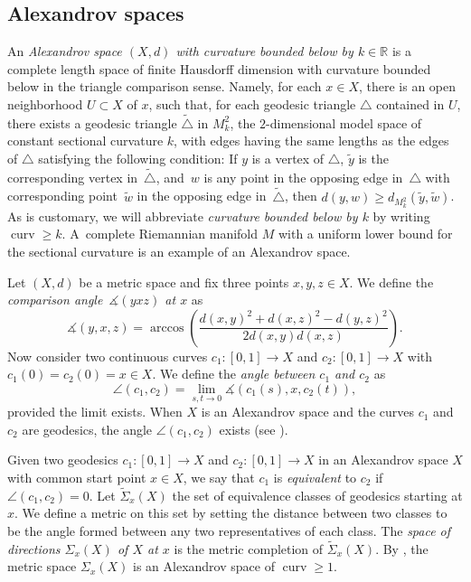\documentclass[pdftex]{sigma}
\numberwithin{equation}{section}
\theoremstyle{definition}
\DeclareMathOperator{\curv}{curv}
\newcommand{\R}{\mathbb{R}} %
\begin{document}
\subsection{Alexandrov spaces}
\label{S: Alexandrov spaces}
An \emph{Alexandrov space $(X, d)$ with curvature bounded below by $k\in \R$} is a complete length space of finite Hausdorff dimension with curvature bounded below in the triangle comparison sense. Namely, for each $x\in X$, there is an open neighborhood $U\subset X$ of $x$, such that, for each geodesic triangle $\triangle$ contained in $U$, there exists a geodesic triangle $\widetilde{\triangle}$ in $M^2_k$, the $2$-dimensional model space of constant sectional curvature $k$, with edges having the same lengths as the edges of $\triangle$ satisfying the following condition: If $y$ is a vertex of $\triangle$, $\widetilde{y}$ is the corresponding vertex in~$\widetilde{\triangle}$, and~$w$ is any point in the opposing edge in~$\triangle$ with corresponding point~$\widetilde{w}$ in the opposing edge in~$\widetilde{\triangle}$, then
$
	d(y,w) \geq d_{M^2_k}(\widetilde{y},\widetilde{w})$.
As is customary, we will abbreviate \emph{curvature bounded below by $k$} by writing $\curv\geq k$. A~complete Riemannian manifold $M$ with a uniform lower bound for the sectional curvature is an example of an Alexandrov space.

Let $(X,d)$ be a metric space and fix three points $x,y,z\in X$. We define the \emph{comparison angle~$\measuredangle(yxz)$ at $x$} as
\[
	\measuredangle (y,x,z) = \arccos\left(\frac{d(x,y)^2+d(x,z)^2-d(y,z)^2}{2d(x,y)d(x,z)} \right).
\]
Now consider two continuous curves $c_1\colon [0,1]\to X$ and $c_2\colon [0,1]\to X$ with $c_1(0) = c_2(0) = {x\in X}$. We define the \emph{angle between $c_1$ and $c_2$} as
\[
	\angle (c_1,c_2) = \lim_{s,t\to 0}	\measuredangle (c_1(s),x,c_2(t)),
\]
provided the limit exists. When $X$ is an Alexandrov space and the curves $c_1$ and $c_2$ are geodesics, the angle $\angle (c_1,c_2)$ exists (see \cite[Proposition 4.3.2]{BuragoBuragoIvanov}).

Given two geodesics $c_1\colon [0,1]\to X$ and $c_2\colon [0,1]\to X$ in an Alexandrov space $X$ with common start point $x\in X$, we say that $c_1$ is \emph{equivalent} to $c_2$ if $\angle (c_1,c_2) =0$. Let $\widetilde{\Sigma}_x(X)$ the set of equivalence classes of geodesics starting at $x$. We define a metric on this set by setting the distance between two classes to be the angle formed between any two representatives of each class. The \emph{space of directions $\Sigma_x(X)$ of $X$ at $x$} is the metric completion of $\widetilde{\Sigma}_x(X)$. By \cite[Corollaries 7.10 and 7.11]{BuragoGromovPerelman1992}, the metric space $\Sigma_x(X)$ is an Alexandrov space of $\curv \geq 1$.
\end{document}
